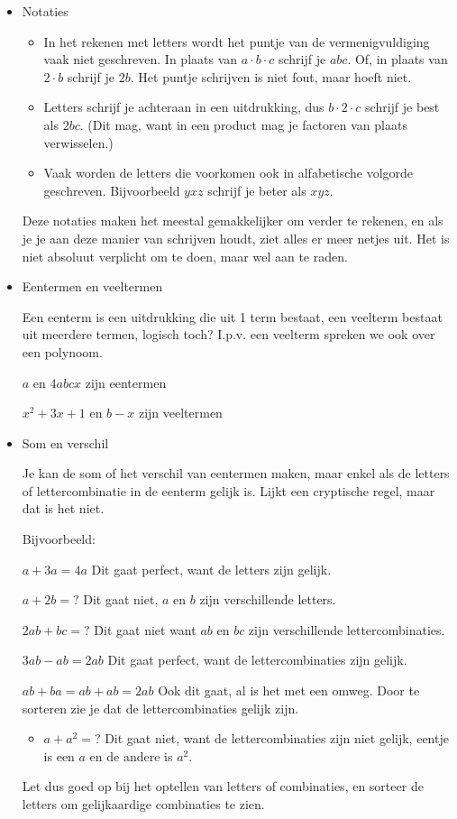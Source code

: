 \begin{itemize}
	\item{Notaties}
	\begin{itemize}
		\item In het rekenen met letters wordt het puntje van de vermenigvuldiging
		vaak niet geschreven. In plaats van $a\cdot b\cdot c$ schrijf je
		$abc$. Of, in plaats van $2\cdot b$ schrijf je $2b$. Het puntje
		schrijven is niet fout, maar hoeft niet.
		\item Letters schrijf je achteraan in een uitdrukking, dus $b\cdot2\cdot c$
		schrijf je best als $2bc$. (Dit mag, want in een product mag je factoren
		van plaats verwisselen.)
		\item Vaak worden de letters die voorkomen ook in alfabetische volgorde
		geschreven. Bijvoorbeeld $yxz$ schrijf je beter als $xyz$. 
	\end{itemize}
	\noindent Deze notaties maken het meestal gemakkelijker om verder
	te rekenen, en als je je aan deze manier van schrijven houdt, ziet
	alles er meer netjes uit. Het is niet absoluut verplicht om te doen,
	maar wel aan te raden.
	
	
	\item{Eentermen en veeltermen}
	
	Een eenterm is een uitdrukking die uit 1 term bestaat, een veelterm
	bestaat uit meerdere termen, logisch toch? I.p.v. een veelterm spreken
	we ook over een polynoom.
	
	\textbullet{} $a$ en $4abcx$ zijn eentermen
	
	\textbullet{} $x^{2}+3x+1$ en $b-x$ zijn veeltermen
	
	
	\item{Som en verschil}
	
	Je kan de som of het verschil van eentermen maken, maar enkel als
	de letters of lettercombinatie in de eenterm gelijk is. Lijkt een
	cryptische regel, maar dat is het niet. 
	
	\noindent Bijvoorbeeld:
	
	\textbullet{} $a+3a=4a$ Dit gaat perfect, want de letters zijn gelijk.
	
	\textbullet{} $a+2b=?$ Dit gaat niet, $a$ en $b$ zijn verschillende
	letters. 
	
	\textbullet{} $2ab+bc=?$ Dit gaat niet want $ab$ en $bc$ zijn verschillende
	lettercombinaties. 
	
	\textbullet{} $3ab-ab=2ab$ Dit gaat perfect, want de lettercombinaties
	zijn gelijk.
	
	\textbullet{} $ab+ba=ab+ab=2ab$ Ook dit gaat, al is het met een omweg.
	Door te sorteren zie je dat de lettercombinaties gelijk zijn.
	\begin{itemize}
		\item $a+a^{2}=?$ Dit gaat niet, want de lettercombinaties zijn niet gelijk,
		eentje is een $a$ en de andere is $a^{2}$.
	\end{itemize}
	Let dus goed op bij het optellen van letters of combinaties, en sorteer
	de letters om gelijkaardige combinaties te zien. 
	

\end{itemize}
